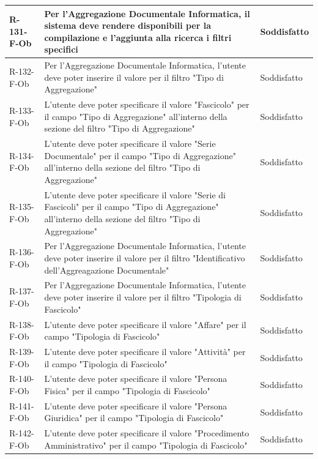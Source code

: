 \begin{longtable}{|p{2.5cm}|p{9.5cm}|p{2.5cm}|}
R-131-F-Ob & Per l'Aggregazione Documentale Informatica, il sistema deve rendere disponibili per la compilazione e l'aggiunta alla ricerca i filtri specifici & Soddisfatto \\
\hline
R-132-F-Ob & Per l'Aggregazione Documentale Informatica, l'utente deve poter inserire il valore per il filtro "Tipo di Aggregazione" & Soddisfatto \\
\hline
R-133-F-Ob & L'utente deve poter specificare il valore "Fascicolo" per il campo "Tipo di Aggregazione" all'interno della sezione del filtro "Tipo di Aggregazione" & Soddisfatto \\
\hline
R-134-F-Ob & L'utente deve poter specificare il valore "Serie Documentale" per il campo "Tipo di Aggregazione" all'interno della sezione del filtro "Tipo di Aggregazione" & Soddisfatto \\
\hline
R-135-F-Ob & L'utente deve poter specificare il valore "Serie di Fascicoli" per il campo "Tipo di Aggregazione" all'interno della sezione del filtro "Tipo di Aggregazione" & Soddisfatto \\
\hline

R-136-F-Ob & Per l'Aggregazione Documentale Informatica, l'utente deve poter inserire il valore per il filtro "Identificativo dell'Aggreagazione Documentale" & Soddisfatto \\
\hline
R-137-F-Ob & Per l'Aggregazione Documentale Informatica, l'utente deve poter inserire il valore per il filtro "Tipologia di Fascicolo" & Soddisfatto \\
\hline
R-138-F-Ob & L'utente deve poter specificare il valore "Affare" per il campo "Tipologia di Fascicolo" & Soddisfatto \\
\hline
R-139-F-Ob & L'utente deve poter specificare il valore "Attività" per il campo "Tipologia di Fascicolo" & Soddisfatto \\
\hline
R-140-F-Ob & L'utente deve poter specificare il valore "Persona Fisica" per il campo "Tipologia di Fascicolo" & Soddisfatto \\
\hline
R-141-F-Ob & L'utente deve poter specificare il valore "Persona Giuridica" per il campo "Tipologia di Fascicolo" & Soddisfatto \\
\hline
R-142-F-Ob & L'utente deve poter specificare il valore "Procedimento Amministrativo" per il campo "Tipologia di Fascicolo" & Soddisfatto \\


\end{longtable}
